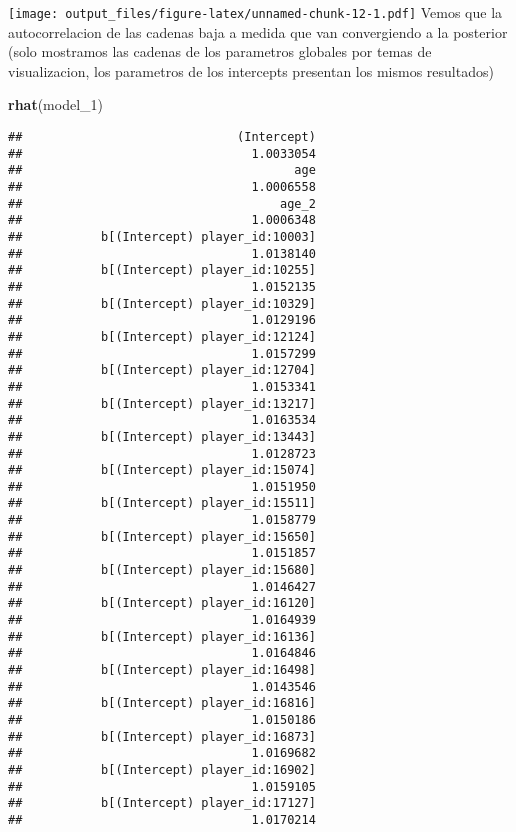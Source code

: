 \documentclass[
]{article}
\newenvironment{Shaded}{\begin{snugshade}}{\end{snugshade}}
\newcommand{\FunctionTok}[1]{\textcolor[rgb]{0.13,0.29,0.53}{\textbf{#1}}}
\newcommand{\NormalTok}[1]{#1}
\begin{document}
\texttt{[image: output\_files/figure-latex/unnamed-chunk-12-1.pdf]} Vemos
que la autocorrelacion de las cadenas baja a medida que van convergiendo
a la posterior (solo mostramos las cadenas de los parametros globales
por temas de visualizacion, los parametros de los intercepts presentan
los mismos resultados)

\begin{Shaded}
\begin{Highlighting}[]
\FunctionTok{rhat}\NormalTok{(model\_1)}
\end{Highlighting}
\end{Shaded}

\begin{verbatim}
##                              (Intercept) 
##                                1.0033054 
##                                      age 
##                                1.0006558 
##                                    age_2 
##                                1.0006348 
##           b[(Intercept) player_id:10003] 
##                                1.0138140 
##           b[(Intercept) player_id:10255] 
##                                1.0152135 
##           b[(Intercept) player_id:10329] 
##                                1.0129196 
##           b[(Intercept) player_id:12124] 
##                                1.0157299 
##           b[(Intercept) player_id:12704] 
##                                1.0153341 
##           b[(Intercept) player_id:13217] 
##                                1.0163534 
##           b[(Intercept) player_id:13443] 
##                                1.0128723 
##           b[(Intercept) player_id:15074] 
##                                1.0151950 
##           b[(Intercept) player_id:15511] 
##                                1.0158779 
##           b[(Intercept) player_id:15650] 
##                                1.0151857 
##           b[(Intercept) player_id:15680] 
##                                1.0146427 
##           b[(Intercept) player_id:16120] 
##                                1.0164939 
##           b[(Intercept) player_id:16136] 
##                                1.0164846 
##           b[(Intercept) player_id:16498] 
##                                1.0143546 
##           b[(Intercept) player_id:16816] 
##                                1.0150186 
##           b[(Intercept) player_id:16873] 
##                                1.0169682 
##           b[(Intercept) player_id:16902] 
##                                1.0159105 
##           b[(Intercept) player_id:17127] 
##                                1.0170214 

\end{verbatim}
\end{document}
